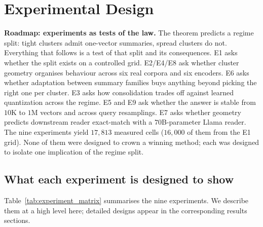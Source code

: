 \section{Experimental Design}
\label{sec:experiments}

\begin{intuition}
\textbf{Roadmap: experiments as tests of the law.} The theorem
predicts a regime split: tight clusters admit one-vector summaries,
spread clusters do not. Everything that follows is a test of
that split and its consequences. E1 asks whether the split exists
on a controlled grid. E2/E4/E8 ask whether cluster geometry
organises behaviour across six real corpora and six encoders.
E6 asks whether adaptation between summary families buys anything
beyond picking the right one per cluster. E3 asks how consolidation
trades off against learned quantization across the regime. E5 and
E9 ask whether the answer is stable from $10$K to $1$M vectors and
across query resamplings. E7 asks whether geometry predicts
downstream reader exact-match with a $70$B-parameter Llama reader.
The nine experiments yield $17{,}813$ measured cells ($16{,}000$ of
them from the E1 grid). None of them were designed to crown a
winning method; each was designed to isolate one implication of
the regime split.
\end{intuition}

\subsection{What each experiment is designed to show}
\label{sec:experiments:purpose}

Table~\ref{tab:experiment_matrix} summarises the nine experiments. We
describe them at a high level here; detailed designs appear in the
corresponding results sections.

